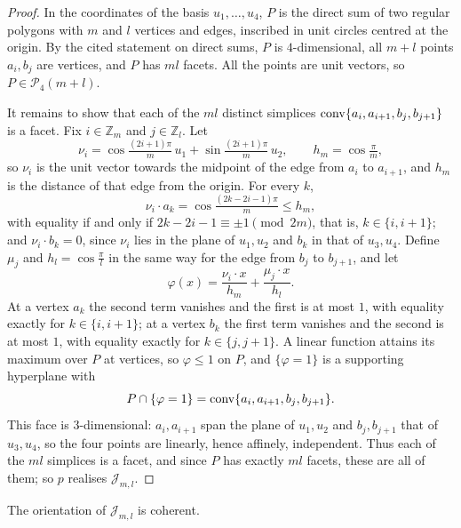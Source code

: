 \begin{proof}
  In the coordinates of the basis $u_{1}, \ldots, u_{4}$, $P$ is the direct sum
  of two regular polygons with $m$ and $l$ vertices and edges, inscribed in unit
  circles centred at the origin. By the cited statement on direct sums, $P$ is
  $4$-dimensional, all $m + l$ points $a_{i}, b_{j}$ are vertices, and $P$ has
  $ml$ facets. All the points are unit vectors, so $P \in \mathcal{P}_{4}(m +
  l)$.

  It remains to show that each of the $ml$ distinct simplices
  $\operatorname{conv}\{a_{i}, a_{i+1}, b_{j}, b_{j+1}\}$ is a facet. Fix $i \in \mathbb{Z}_{m}$
  and $j \in \mathbb{Z}_{l}$. Let
  \[
    \nu_{i} = \cos\tfrac{(2i+1)\pi}{m}\,u_{1} + \sin\tfrac{(2i+1)\pi}{m}\,u_{2},
    \qquad h_{m} = \cos\tfrac{\pi}{m},
  \]
  so $\nu_{i}$ is the unit vector towards the midpoint of the edge from
  $a_{i}$ to $a_{i+1}$, and $h_{m}$ is the distance of that edge from the
  origin. For every $k$,
  \[
    \nu_{i} \cdot a_{k} = \cos\tfrac{(2k-2i-1)\pi}{m} \leq h_{m},
  \]
  with equality if and only if $2k - 2i - 1 \equiv \pm 1 \pmod{2m}$, that is,
  $k \in \{i, i+1\}$; and $\nu_{i} \cdot b_{k} = 0$, since $\nu_{i}$ lies in
  the plane of $u_{1}, u_{2}$ and $b_{k}$ in that of $u_{3}, u_{4}$. Define
  $\mu_{j}$ and $h_{l} = \cos\frac{\pi}{l}$ in the same way for the edge from
  $b_{j}$ to $b_{j+1}$, and let
  \[
    \varphi(x) = \frac{\nu_{i} \cdot x}{h_{m}} + \frac{\mu_{j} \cdot x}{h_{l}}.
  \]
  At a vertex $a_{k}$ the second term vanishes and the first is at most $1$,
  with equality exactly for $k \in \{i, i+1\}$; at a vertex $b_{k}$ the first
  term vanishes and the second is at most $1$, with equality exactly for
  $k \in \{j, j+1\}$. A linear function attains its maximum over $P$ at
  vertices, so $\varphi \leq 1$ on $P$, and $\{\varphi = 1\}$ is a supporting
  hyperplane with
  \[
    P \cap \{\varphi = 1\} = \operatorname{conv}\{a_{i}, a_{i+1}, b_{j}, b_{j+1}\}.
  \]
  This face is $3$-dimensional: $a_{i}, a_{i+1}$ span the plane of
  $u_{1}, u_{2}$ and $b_{j}, b_{j+1}$ that of $u_{3}, u_{4}$, so the four
  points are linearly, hence affinely, independent. Thus each of the $ml$
  simplices is a facet, and since $P$ has exactly $ml$ facets, these are all
  of them; so $p$ realises $\mathcal{J}_{m,l}$.
\end{proof}

\begin{lemma}
  \label{lem:coherent}
  The orientation of $\mathcal{J}_{m,l}$ is coherent.
\end{lemma}

